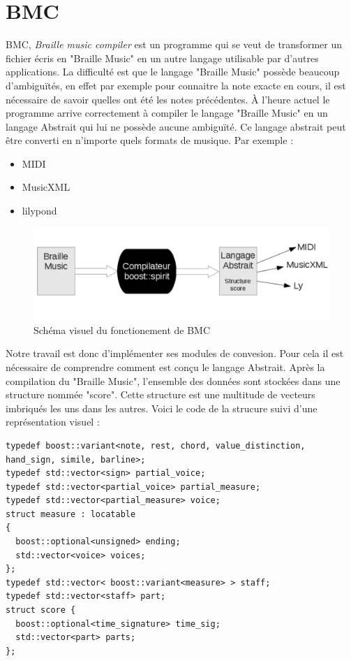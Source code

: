 \section{BMC}

BMC, \textit{Braille music compiler} est un programme qui se veut de transformer un fichier écris en "Braille Music" en un autre langage utilisable par d'autres applications. La difficulté est que le langage "Braille Music" possède beaucoup d'ambiguïtés, en effet par exemple pour connaitre la note exacte en cours, il est nécessaire de savoir quelles ont été les notes précédentes. À l'heure actuel le programme arrive correctement à compiler le langage "Braille Music" en un langage Abstrait qui lui ne possède aucune ambiguïté. Ce langage abstrait peut être converti en n'importe quels formats de musique. Par exemple : 
\begin{itemize}
\item MIDI
\item MusicXML
\item lilypond
\end{itemize}
\begin{figure}[!h]
  \centering
  \includegraphics[scale=0.4]{images/fonction-bmc.png}
  \caption{Schéma visuel du fonctionement de BMC}
  
\end{figure}

Notre travail est donc d'implémenter ses modules de convesion. Pour cela il est nécessaire de comprendre comment est conçu le langage Abstrait. Après la compilation du "Braille Music", l'ensemble des données sont stockées dans une structure nommée "score". Cette structure est une multitude de vecteurs imbriqués les uns dans les autres. Voici le code de la strucure suivi d'une représentation visuel :

\begin{verbatim}
typedef boost::variant<note, rest, chord, value_distinction, hand_sign, simile, barline>;
typedef std::vector<sign> partial_voice;
typedef std::vector<partial_voice> partial_measure;
typedef std::vector<partial_measure> voice;
struct measure : locatable
{
  boost::optional<unsigned> ending;
  std::vector<voice> voices;
};
typedef std::vector< boost::variant<measure> > staff;
typedef std::vector<staff> part;
struct score {
  boost::optional<time_signature> time_sig;
  std::vector<part> parts;
};
\end{verbatim}


